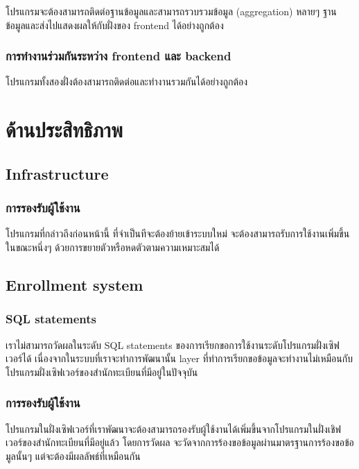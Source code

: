 โปรแกรมจะต้องสามารถติดต่อฐานข้อมูลและสามารถรวบรวมข้อมูล (aggregation) หลายๆ ฐานข้อมูลและส่งไปแสดงผลให้กับฝั่งของ frontend ได้อย่างถูกต้อง

\subsubsection{การทำงานร่วมกันระหว่าง frontend และ backend}

โปรแกรมทั้งสองฝั่งต้องสามารถติดต่อและทำงานรวมกันได้อย่างถูกต้อง

\section{ด้านประสิทธิภาพ}

\subsection{Infrastructure}

\subsubsection{การรองรับผู้ใช้งาน}

โปรแกรมที่กล่าวถึงก่อนหน้านี้ ที่จำเป็นทีจะต้องย้ายเข้าระบบใหม่ จะต้องสามารถรับการใช้งานเพิ่มขึ้นในขณะหนึ่งๆ ด้วยการขยายตัวหรือหดตัวตามความเหมาะสมได้

\subsection{Enrollment system}

\subsubsection{SQL statements}

เราไม่สามารถวัดผลในระดับ SQL statements ของการเรียกขอการใช้งานระดับโปรแกรมฝั่งเซิฟเวอร์ได้ เนื่องจากในระบบที่เราจะทำการพัฒนานั้น layer ที่ทำการเรียกขอข้อมูลจะทำงานไม่เหมือนกับโปรแกรมฝั่งเซิฟเวอร์ของสำนักทะเบียนที่มีอยู่ในปัจจุบัน

\subsubsection{การรองรับผู้ใช้งาน}

โปรแกรมในฝั่งเซิฟเวอร์ที่เราพัฒนาจะต้องสามารถรองรับผู้ใช้งานได้เพิ่มขึ้นจากโปรแกรมในฝั่งเชิฟเวอร์ของสำนักทะเบียนที่มีอยู่แล้ว โดยการวัดผล จะวัดจากการร้องขอข้อมูลผ่านมาตรฐานการร้องขอข้อมูลนั้นๆ แต่จะต้องมีผลลัพธ์ที่เหมือนกัน
